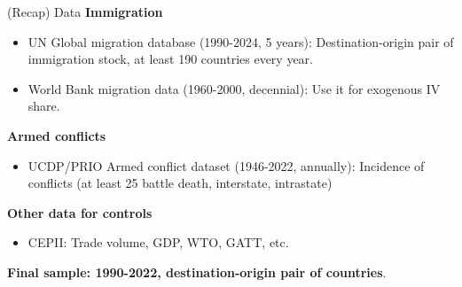 \documentclass[notes,11pt, aspectratio=169]{beamer}
\begin{document}
\begin{frame}{(Recap) Data}
	\textbf{Immigration}
	\begin{itemize}
		\item UN Global migration database (1990-2024, 5 years): Destination-origin pair of immigration stock, at least 190 countries every year. 
		\item World Bank migration data (1960-2000, decennial): Use it for exogenous IV share.
	\end{itemize}\vspace{1em}

	\textbf{Armed conflicts}
	\begin{itemize}
		\item UCDP/PRIO Armed conflict dataset (1946-2022, annually): Incidence of conflicts (at least 25 battle death, interstate, intrastate) 
	\end{itemize}\vspace{1em}

	\textbf{Other data for controls}
	\begin{itemize}
		\item CEPII: Trade volume, GDP, WTO, GATT, etc.
	\end{itemize}\vspace{1em}
	\begin{center}
	\textbf{Final sample: 1990-2022, destination-origin pair of countries}.
	\end{center}
\end{frame}
\end{document}
